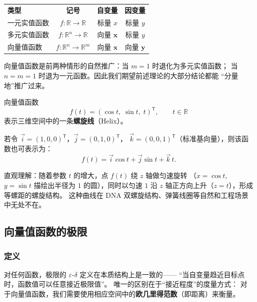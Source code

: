 \documentclass[lang=cn,11pt]{elegantbook}
\begin{document}
\begin{note}[三种函数类型的比较]
\begin{center}
\renewcommand{\arraystretch}{1.4}
\begin{tabular}{@{}lccc@{}}
\textbf{类型} & \textbf{记号} & \textbf{自变量} & \textbf{因变量} \\
一元实值函数 & $f:\mathbb R\to\mathbb R$ & 标量 $x$ & 标量 $y$ \\
多元实值函数 & $f:\mathbb R^n\to\mathbb R$ & 向量 $\boldsymbol x$ & 标量 $y$ \\
向量值函数 & $f:\mathbb R^n\to\mathbb R^m$ & 向量 $\boldsymbol x$ & 向量 $\boldsymbol y$
\end{tabular}
\end{center}
向量值函数是前两种情形的自然推广：当 $m=1$ 时退化为多元实值函数；
当 $n=m=1$ 时退为一元函数。因此我们期望前述理论的大部分结论都能
“分量地”推广过来。
\end{note}

\begin{exercise}[空间螺旋线] \label{ex:helix}
向量值函数
\[
f(t)=(\cos t,\;\sin t,\;t)^{\mathsf T},\qquad t\in\mathbb R
\]
表示三维空间中的一条\textbf{螺旋线}（Helix）。

若令 $\vec i=(1,0,0)^{\mathsf T}$，$\vec j=(0,1,0)^{\mathsf T}$，
$\vec k=(0,0,1)^{\mathsf T}$（标准基向量），则该函数也可表示为：
\[
f(t)=\vec i\cos t+\vec j\sin t+\vec k\,t.
\]

直观理解：随着参数 $t$ 的增大，点 $f(t)$ 绕 $z$ 轴做匀速旋转
（$x=\cos t$, $y=\sin t$ 描绘出半径为 $1$ 的圆），同时以匀速 $1$
沿 $z$ 轴正方向上升（$z=t$），形成等螺距的螺旋结构。
这种曲线在 DNA 双螺旋结构、弹簧线圈等自然和工程场景中无处不在。
\end{exercise}


\subsection{向量值函数的极限}

\subsubsection*{定义}

对任何函数，极限的 $\varepsilon$-$\delta$ 定义在本质结构上是一致的——
“当自变量趋近目标点时，函数值可以任意接近极限值”。
唯一的区别在于“接近程度”的度量方式：
对于向量值函数，我们需要使用相应空间中的\textbf{欧几里得范数}（即距离）来衡量。
\end{document}
